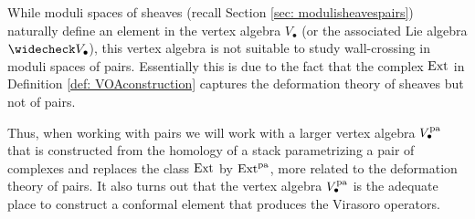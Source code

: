 \documentclass[a4paper, 12pt]{amsart}
\begin{document}
While moduli spaces of sheaves (recall Section \ref{sec: modulisheavespairs}) naturally define an element in the vertex algebra $V_\bullet$ (or the associated Lie algebra $\widecheck V_\bullet$), this vertex algebra is not suitable to study wall-crossing in moduli spaces of pairs. Essentially this is due to the fact that the complex $\textup{Ext}$ in Definition \ref{def: VOAconstruction} captures the deformation theory of sheaves but not of pairs. 

Thus, when working with pairs we will work with a larger vertex algebra $V_\bullet^{\mathop{\rm pa}\nolimits}$ that is constructed from the homology of a stack parametrizing a pair of complexes and replaces the class $\textup{Ext}$ by $\textup{Ext}^{\mathop{\rm pa}\nolimits}$, more related to the deformation theory of pairs. It also turns out that the vertex algebra $V_\bullet^{\mathop{\rm pa}\nolimits}$ is the adequate place to construct a conformal element that produces the Virasoro operators. 
\end{document}
